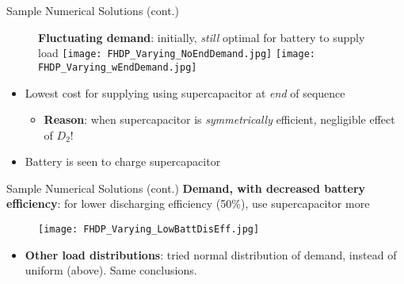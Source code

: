 \documentclass{beamer}
\begin{document}
\begin{frame}{Sample Numerical Solutions (cont.)}
\begin{figure}
\textbf{Fluctuating demand}: initially, \textit{still} optimal for battery to supply load
\texttt{[image: FHDP\_Varying\_NoEndDemand.jpg]}
\texttt{[image: FHDP\_Varying\_wEndDemand.jpg]}
\end{figure}
\begin{itemize}
\item Lowest cost for supplying using supercapacitor at \textit{end} of sequence
\begin{itemize}
\item \textbf{Reason}: when supercapacitor is \textit{symmetrically} efficient, negligible effect of $D_{2}$!
\end{itemize}
\item Battery is seen to charge supercapacitor
\end{itemize}
\end{frame}

\begin{frame}{Sample Numerical Solutions (cont.)}
\textbf{Demand, with decreased battery efficiency}: for lower discharging efficiency (50\%), use supercapacitor more
\begin{figure}
\texttt{[image: FHDP\_Varying\_LowBattDisEff.jpg]}
\end{figure}
\begin{itemize}
\item \textbf{Other load distributions}: tried normal distribution of demand, instead of uniform (above). Same conclusions.
\end{itemize}
\end{frame}
\end{document}
